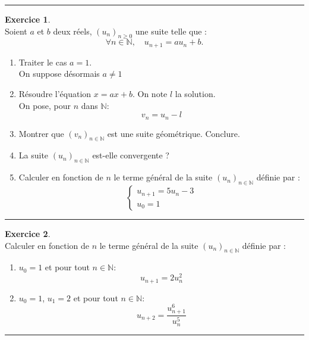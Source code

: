 \documentclass[10pt,a4paper]{article}
\newcommand{\N}{\mathbb{N}}
\theoremstyle{definition}
\theoremstyle{definition}
\newtheorem{exo}{Exercice}
\begin{document}
\begin{center}
\begin{minipage}[t]{0.47\linewidth}
\begin{center}
\rule{1\linewidth}{0.6pt}
\end{center}

\end{minipage}	
\hfill\vrule\hfill
\begin{minipage}[t]{0.47\linewidth}
\raggedright

\begin{exo}\quad\\
Soient $a$ et $b$ deux réels, $(u_n)_{n\geq 0}$ une suite telle que :
$$\forall n\in \N,\quad  u_{n+1} =au_n +b.$$
\begin{enumerate}
\item Traiter le cas $a = 1$.\\
On suppose désormais $a\neq 1$
\item Résoudre l'équation $x = ax + b$. On note $l$ la solution. \\
 On pose, pour $n$ dans $\N$:
$$v_n = u_n - l$$
\item Montrer que $(v_n)_{n\in\N}$ est une suite géométrique. Conclure.
\item La suite $(u_n)_{n\in\N}$ est-elle convergente ? 
\item Calculer en fonction de $n$ le terme général de la suite $\left(u_n\right)_{n\in\N}$ définie par :
$$\left\{\begin{array}{l}
u_{n+1} = 5u_n - 3\\
u_0 = 1
\end{array}\right.$$
\end{enumerate}
\end{exo}
\begin{center}
\rule{1\linewidth}{0.6pt}
\end{center}

\begin{exo}\quad\\
Calculer en fonction de $n$ le terme général de la suite $\left(u_n\right)_{n\in\N}$ définie par :
\begin{enumerate}
\item $u_0 = 1$ et pour tout $n\in\N$:  %
$$u_{n+1} = 2u_n^2$$
\item $u_0 = 1$, $u_1 = 2$ et pour tout $n\in\N$:
$$u_{n+2} = \dfrac{u_{n+1}^6}{u_{n}^5}$$
\end{enumerate}
\end{exo}
\begin{center}
\rule{1\linewidth}{0.6pt}
\end{center}
	\end{minipage}
\end{center}
\quad \\
\end{document}
